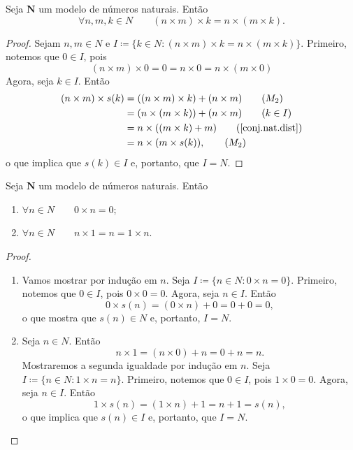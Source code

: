 \begin{teo} \label{conj.nat.ass.mul}
	Seja $\bm N$ um modelo de números naturais. Então
	\begin{equation*}
	\forall n,m,k \in N \qquad (n \times m) \times k = n \times (m \times k).
	\end{equation*}
\end{teo}
\begin{proof}
	Sejam $n,m \in N$ e $I \coloneqq \{k \in N:(n \times m) \times k = n \times (m \times k)\}$. Primeiro, notemos que $0 \in I$, pois
	\begin{equation*}
	(n \times m) \times 0 = 0 = n \times 0 = n \times (m \times 0) \tag{$M_1$}
	\end{equation*}
Agora, seja $k \in I$. Então
	\begin{align*}
	(n \times m) \times s(k)
		&= ((n \times m) \times k) + (n \times m) 			\tag{$M_2$} \\
		&= (n \times (m \times k)) + (n \times m)			\tag{$k \in I$} \\
		&= n \times ((m \times k) + m)							\tag{$\ref{conj.nat.dist}$} \\
		&= n \times (m \times s(k)),								\tag{$M_2$}
	\end{align*}
o que implica que $s(k) \in I$ e, portanto, que $I=N$.
\end{proof}

\begin{lema} \label{conj.nat.lem.mult}
	Seja $\bm N$ um modelo de números naturais. Então
	\begin{enumerate}
	\item $\forall n \in N \qquad 0 \times n = 0$;
	\item $\forall n \in N \qquad n \times 1 = n = 1 \times n$.
	\end{enumerate}
\end{lema}
\begin{proof}
	\begin{enumerate}
	\item Vamos mostrar por indução em $n$. Seja $I \coloneqq \{n \in N:0 \times n=0\}$. Primeiro, notemos que $0 \in I$, pois $0 \times 0 = 0$. Agora, seja $n \in I$. Então
	\begin{equation*}
	0 \times s(n) = (0 \times n) + 0 = 0 + 0 = 0,
	\end{equation*}
o que mostra que $s(n) \in N$ e, portanto, $I=N$.
	
	\item Seja $n \in N$. Então
	\begin{equation*}
	n \times 1 = (n \times 0) + n = 0+ n = n.
	\end{equation*}
Mostraremos a segunda igualdade por indução em $n$. Seja $I \coloneqq \{n \in N:1 \times n = n\}$. Primeiro, notemos que $0 \in I$, pois $1 \times 0 = 0.$ Agora, seja $n \in I$. Então
	\begin{equation*}
	1 \times s(n) = (1 \times n)+1 = n+1=s(n),
	\end{equation*}
o que implica que $s(n) \in I$ e, portanto, que $I=N$.
	\end{enumerate}
\end{proof}

